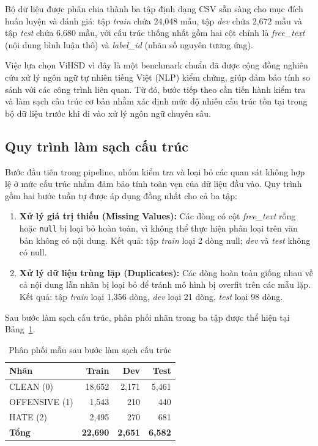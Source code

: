 Bộ dữ liệu được phân chia thành ba tập định dạng CSV sẵn sàng cho mục đích huấn luyện và đánh giá: tập \textit{train} chứa 24,048 mẫu, tập \textit{dev} chứa 2,672 mẫu và tập \textit{test} chứa 6,680 mẫu, với cấu trúc thống nhất gồm hai cột chính là \textit{free\_text} (nội dung bình luận thô) và \textit{label\_id} (nhãn số nguyên tương ứng).

Việc lựa chọn ViHSD vì đây là một benchmark chuẩn đã được cộng đồng nghiên cứu xử lý ngôn ngữ tự nhiên tiếng Việt (NLP) kiểm chứng, giúp đảm bảo tính so sánh với các công trình liên quan.
Từ đó, bước tiếp theo cần tiến hành kiểm tra và làm sạch cấu trúc cơ bản nhằm xác định mức độ nhiễu cấu trúc tồn tại trong bộ dữ liệu trước khi đi vào xử lý ngôn ngữ chuyên sâu.

\subsection{Quy trình làm sạch cấu trúc}
Bước đầu tiên trong pipeline, nhóm kiểm tra và loại bỏ các quan sát không hợp lệ ở mức cấu trúc nhằm đảm bảo tính toàn vẹn của dữ liệu đầu vào. Quy trình gồm hai bước tuần tự được áp dụng đồng nhất cho cả ba tập:

\begin{enumerate}
    \item \textbf{Xử lý giá trị thiếu (Missing Values):} Các dòng có cột \textit{free\_text} rỗng hoặc \texttt{null} bị loại bỏ hoàn toàn, vì không thể thực hiện phân loại trên văn bản không có nội dung. Kết quả: tập \textit{train} loại 2 dòng null; \textit{dev} và \textit{test} không có null.
    \item \textbf{Xử lý dữ liệu trùng lặp (Duplicates):} Các dòng hoàn toàn giống nhau về cả nội dung lẫn nhãn bị loại bỏ để tránh mô hình bị overfit trên các mẫu lặp. Kết quả: tập \textit{train} loại 1,356 dòng, \textit{dev} loại 21 dòng, \textit{test} loại 98 dòng.
\end{enumerate}

Sau bước làm sạch cấu trúc, phân phối nhãn trong ba tập được thể hiện tại Bảng~\ref{tab:structural_clean}.

\begin{table}[H]
    \centering
    \caption{Phân phối mẫu sau bước làm sạch cấu trúc}
    \label{tab:structural_clean}
    \begin{tabular}{lrrr}
        \hline
        \textbf{Nhãn} & \textbf{Train}  & \textbf{Dev}   & \textbf{Test}  \\
        \hline
        CLEAN (0)     & 18,652          & 2,171          & 5,461          \\
        OFFENSIVE (1) & 1,543           & 210            & 440            \\
        HATE (2)      & 2,495           & 270            & 681            \\
        \hline
        \textbf{Tổng} & \textbf{22,690} & \textbf{2,651} & \textbf{6,582} \\
        \hline
    \end{tabular}
\end{table}

